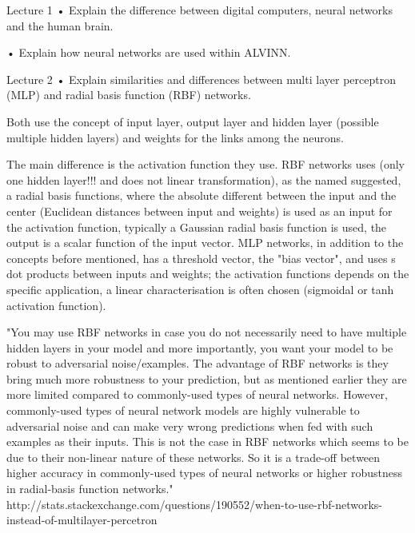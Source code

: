 Lecture 1
• Explain the difference between digital computers, neural networks and the human brain.

• Explain how neural networks are used within ALVINN. 


Lecture 2
• Explain similarities and differences between multi layer perceptron (MLP) and radial basis function (RBF) networks.

Both use the concept of input layer, output layer and hidden layer (possible multiple hidden layers) and weights for the links among the neurons.

The main difference is the activation function they use. RBF networks uses (only one hidden layer!!! and does not linear transformation), as the named suggested, a radial basis functions, where the absolute different between the input and the center (Euclidean distances between input and weights) is used as an input for the activation function, typically a Gaussian radial basis function is used, the output is a scalar function of the input vector. MLP networks, in addition to the concepts before mentioned, has a threshold vector, the "bias vector", and uses s dot products between inputs and weights; the activation functions depends on the specific application, a linear characterisation is often chosen (sigmoidal or tanh activation function).

"You may use RBF networks in case you do not necessarily need to have multiple hidden layers in your model and more importantly, you want your model to be robust to adversarial noise/examples. The advantage of RBF networks is they bring much more robustness to your prediction, but as mentioned earlier they are more limited compared to commonly-used types of neural networks. However, commonly-used types of neural network models are highly vulnerable to adversarial noise and can make very wrong predictions when fed with such examples as their inputs. This is not the case in RBF networks which seems to be due to their non-linear nature of these networks. So it is a trade-off between higher accuracy in commonly-used types of neural networks or higher robustness in radial-basis function networks." http://stats.stackexchange.com/questions/190552/when-to-use-rbf-networks-instead-of-multilayer-percetron


